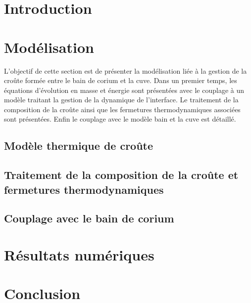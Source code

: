 \documentclass[12pt,a4paper]{article}
\begin{document}
\section{Introduction} \label{sect:introduction}

\section{Modélisation}
L'objectif de cette section est de présenter la modélisation liée à la gestion de la croûte formée entre le bain de corium et la cuve. Dans un premier temps, les équations d'évolution en masse et énergie sont présentées avec le couplage à un modèle traitant la gestion de la dynamique de l'interface. Le traitement de la composition de la croûte ainsi que les fermetures thermodynamiques associées sont présentées. Enfin le couplage avec le modèle bain et la cuve est détaillé. 
\subsection{Modèle thermique de croûte} \label{sect:thermique}

\subsection{Traitement de la composition de la croûte et fermetures thermodynamiques} \label{sect:thermochimie}

\subsection{Couplage avec le bain de corium}\label{couplage}

\section{Résultats numériques}

\section{Conclusion} \label{sect:conclusion}




\end{document}
